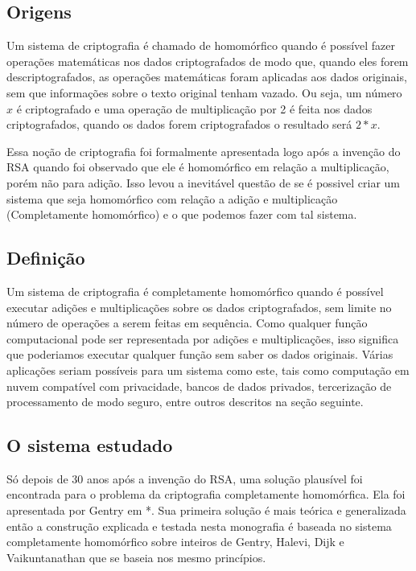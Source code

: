 	\subsection{Origens}
	Um sistema de criptografia é chamado de homomórfico quando é possível fazer operações matemáticas nos dados criptografados de modo que, quando eles forem descriptografados, as operações matemáticas foram aplicadas aos dados originais, sem que informações sobre o texto original tenham vazado.
Ou seja, um número $x$ é criptografado e uma operação de multiplicação por 2 é feita nos dados criptografados, quando os dados forem criptografados o resultado será $2*x$.

Essa noção de criptografia foi formalmente apresentada logo após a invenção do RSA quando foi observado que ele é homomórfico em relação a multiplicação, porém não para adição.
Isso levou a inevitável questão de se é possivel criar um sistema que seja homomórfico com relação a adição e multiplicação (Completamente homomórfico) e o que podemos fazer com tal sistema.

	\subsection{Definição}
	Um sistema de criptografia é completamente homomórfico quando é possível executar adições e multiplicações sobre os dados criptografados, sem limite no número de operações a serem feitas em sequência.
	Como qualquer função computacional pode ser representada por adições e multiplicações, isso significa que poderiamos executar qualquer função sem saber os dados originais. Várias aplicações seriam possíveis para um sistema como este, tais como computação em nuvem compatível com privacidade, bancos de dados privados, tercerização de processamento de modo seguro, entre outros descritos na seção seguinte.
	
	\subsection{O sistema estudado}
	Só depois de 30 anos após a invenção do RSA, uma solução plausível foi encontrada para o problema da criptografia completamente homomórfica. Ela foi apresentada por Gentry em *. Sua primeira solução é mais teórica e generalizada então a construção explicada e testada nesta monografia é baseada no sistema completamente homomórfico sobre inteiros de Gentry, Halevi, Dijk e Vaikuntanathan que se baseia nos mesmo princípios.

\newpage
  
